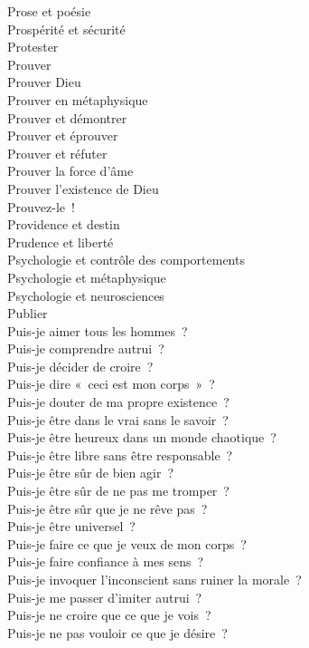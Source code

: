 \documentclass[a4paper,12pt]{article}
\begin{document}
Prose et poésie \\
Prospérité et sécurité \\
Protester \\
Prouver \\
Prouver Dieu \\
Prouver en métaphysique \\
Prouver et démontrer \\
Prouver et éprouver \\
Prouver et réfuter \\
Prouver la force d'âme \\
Prouver l'existence de Dieu \\
Prouvez-le ! \\
Providence et destin \\
Prudence et liberté \\
Psychologie et contrôle des comportements \\
Psychologie et métaphysique \\
Psychologie et neurosciences \\
Publier \\
Puis-je aimer tous les hommes ? \\
Puis-je comprendre autrui ? \\
Puis-je décider de croire ? \\
Puis-je dire « ceci est mon corps » ? \\
Puis-je douter de ma propre existence ? \\
Puis-je être dans le vrai sans le savoir ? \\
Puis-je être heureux dans un monde chaotique ? \\
Puis-je être libre sans être responsable ? \\
Puis-je être sûr de bien agir ? \\
Puis-je être sûr de ne pas me tromper ? \\
Puis-je être sûr que je ne rêve pas ? \\
Puis-je être universel ? \\
Puis-je faire ce que je veux de mon corps ? \\
Puis-je faire confiance à mes sens ? \\
Puis-je invoquer l'inconscient sans ruiner la morale ? \\
Puis-je me passer d'imiter autrui ? \\
Puis-je ne croire que ce que je vois ? \\
Puis-je ne pas vouloir ce que je désire ? \\
\end{document}
